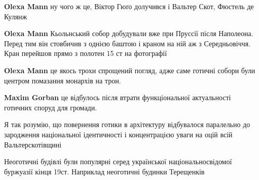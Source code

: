 \begin{itemize}
\begin{itemize}
\textbf{Olexa Mann} ну чого ж це, Віктор Гюґо долучився і Вальтер Скот, Фюстель де Кулянж

 
\textbf{Olexa Mann} Кьольнський собор добудували вже при Пруссії після Наполеона. Перед тим він стовбичив з однією баштою і краном на ній аж з Середньовіччя. Кран перейшов прямо з полотен 15 ст на фотографії

 
\textbf{Olexa Mann} це якось трохи спрощений погляд, адже саме готичні собори були центром помазання монархів на трон.

 

\textbf{Maxim Gorban} це відбулось після втрати функціональної актуальності готичних споруд для громади.

 
Я так розумію, що повернення готики в архітектуру відбувалося паралельно до зародження національної ідентичності і концентрацією уваги на оцій всій Вальтерскотівщині

 
Неоготичні будівлі були популярні серед української національносвідомої буржуазії кінця 19ст. Наприклад неоготичні будинки Терещенків
\end{itemize} %

\end{itemize} %

